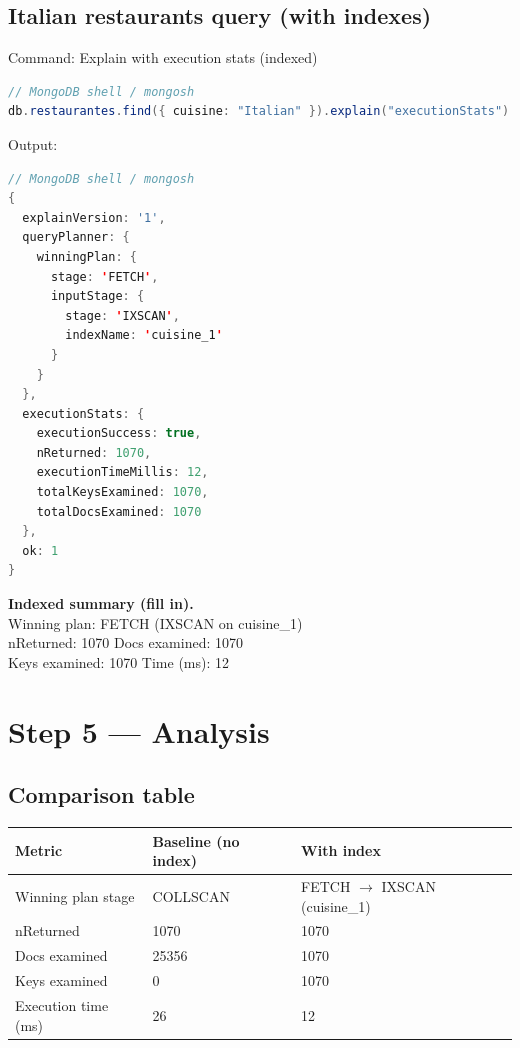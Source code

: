 \documentclass[11pt, letterpaper]{article}
\begin{document}
\subsection{Italian restaurants query (with indexes)}

\begin{labstep}{Command: Explain with execution stats (indexed)}
\begin{lstlisting}[language=Java]
// MongoDB shell / mongosh
db.restaurantes.find({ cuisine: "Italian" }).explain("executionStats")
\end{lstlisting}
\end{labstep}

\begin{labstep}{Output:}
\begin{lstlisting}[language=Java]
// MongoDB shell / mongosh
{
  explainVersion: '1',
  queryPlanner: {
    winningPlan: {
      stage: 'FETCH',
      inputStage: {
        stage: 'IXSCAN',
        indexName: 'cuisine_1'
      }
    }
  },
  executionStats: {
    executionSuccess: true,
    nReturned: 1070,
    executionTimeMillis: 12,
    totalKeysExamined: 1070,
    totalDocsExamined: 1070
  },
  ok: 1
}
\end{lstlisting}
\end{labstep}

\begin{tcolorbox}
\textbf{Indexed summary (fill in).}\\
Winning plan: FETCH (IXSCAN on cuisine\_1)\\
nReturned: 1070 \quad
Docs examined: 1070\\
Keys examined: 1070 \quad
Time (ms): 12
\end{tcolorbox}

\section{Step 5 — Analysis}
\subsection{Comparison table}
\begin{tcolorbox}
\begin{tabular}{p{4.2cm}p{5.0cm}p{5.0cm}}
\textbf{Metric} & \textbf{Baseline (no index)} & \textbf{With index} \\
\hline
Winning plan stage & COLLSCAN & FETCH $\rightarrow$ IXSCAN (cuisine\_1) \\
nReturned & 1070 & 1070 \\
Docs examined & 25356 & 1070 \\
Keys examined & 0 & 1070 \\
Execution time (ms) & 26 & 12 \\
\end{tabular}
\end{tcolorbox}
\end{document}
